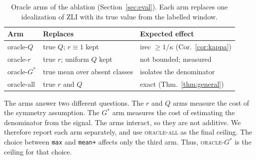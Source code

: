 \begin{table}[t]
\centering
\caption{Oracle arms of the ablation (Section~\ref{sec:eval}). Each arm
replaces one idealization of ZLI with its true value from the labelled
window.}
\label{tab:oracle}
\footnotesize
\setlength{\tabcolsep}{3pt}
\begin{tabular}{@{}p{1.3cm} p{1.9cm} p{3.1cm}@{}}
\toprule
Arm & Replaces & Expected effect \\
\midrule
oracle-\(Q\) & true \(Q\); \(r\equiv1\) kept & irec \(\ge 1/\kappa\) (Cor.~\ref{cor:kappa}) \\
oracle-\(r\) & true \(r\); uniform \(Q\) kept & not bounded; measured \\
oracle-\(G^*\) & true mean over absent classes & isolates the denominator \\
\midrule
oracle-all & true \(r\) and \(Q\) & exact (Thm.~\ref{thm:general}) \\
\bottomrule
\end{tabular}
\end{table}

The arms answer two different questions. The \(r\) and \(Q\) arms measure
the cost of the symmetry assumption. The \(G^*\) arm measures the cost of
estimating the denominator from the signal. The arms interact, so they are
not additive. We therefore report each arm separately, and use
\textsc{oracle-all} as the final ceiling. The choice between
\texttt{max} and \texttt{mean+} affects only the third arm. Thus,
\textsc{oracle-}\(G^*\) is the ceiling for that choice.

